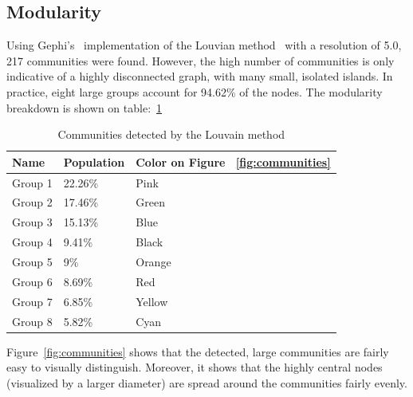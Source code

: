 \subsection{Modularity}\label{subsec:modularity}
Using Gephi's~\cite{Gephi} implementation of the Louvian method~\cite{Louvian} with a resolution of 5.0,
217 communities were found.
However, the high number of communities is only indicative of a highly disconnected graph, with many small, isolated islands.
In practice, eight large groups account for 94.62\% of the nodes.
The modularity breakdown is shown on table:~\ref{tab:luv-communities}


\begin{table}[]
\centering
\begin{tabular}{|l|l|l|}
\hline
\textbf{Name} & \textbf{Population} & \textbf{Color on Figure ~\ref{fig:communities}} \\ \hline
Group 1       & 22.26\%             & Pink                     \\ \hline
Group 2       & 17.46\%             & Green                    \\ \hline
Group 3       & 15.13\%             & Blue                     \\ \hline
Group 4       & 9.41\%              & Black                    \\ \hline
Group 5       & 9\%                 & Orange                   \\ \hline
Group 6       & 8.69\%              & Red                      \\ \hline
Group 7       & 6.85\%                & Yellow                   \\ \hline
Group 8       & 5.82\%                & Cyan                     \\ \hline
\end{tabular}
\caption{Communities detected by the Louvain method}
\label{tab:luv-communities}
\end{table}

Figure~\ref{fig:communities} shows that the detected, large communities are fairly easy to visually distinguish.
Moreover, it shows that the highly central nodes (visualized by a larger diameter) are spread around the communities fairly evenly.


